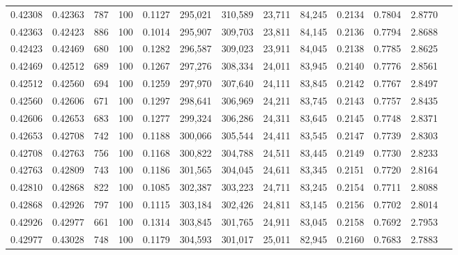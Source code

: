\begin{tabular}{rrrrrrrrrrrrr}
0.42308 & 0.42363 &   787 & 100 &                                     0.1127 & 295,021 & 310,589 &  23,711 &  84,245 & 0.2134 & 0.7804 & 2.8770 \\
0.42363 & 0.42423 &   886 & 100 &                                     0.1014 & 295,907 & 309,703 &  23,811 &  84,145 & 0.2136 & 0.7794 & 2.8688 \\
0.42423 & 0.42469 &   680 & 100 &                                     0.1282 & 296,587 & 309,023 &  23,911 &  84,045 & 0.2138 & 0.7785 & 2.8625 \\
0.42469 & 0.42512 &   689 & 100 &                                     0.1267 & 297,276 & 308,334 &  24,011 &  83,945 & 0.2140 & 0.7776 & 2.8561 \\
0.42512 & 0.42560 &   694 & 100 &                                     0.1259 & 297,970 & 307,640 &  24,111 &  83,845 & 0.2142 & 0.7767 & 2.8497 \\
0.42560 & 0.42606 &   671 & 100 &                                     0.1297 & 298,641 & 306,969 &  24,211 &  83,745 & 0.2143 & 0.7757 & 2.8435 \\
0.42606 & 0.42653 &   683 & 100 &                                     0.1277 & 299,324 & 306,286 &  24,311 &  83,645 & 0.2145 & 0.7748 & 2.8371 \\
0.42653 & 0.42708 &   742 & 100 &                                     0.1188 & 300,066 & 305,544 &  24,411 &  83,545 & 0.2147 & 0.7739 & 2.8303 \\
0.42708 & 0.42763 &   756 & 100 &                                     0.1168 & 300,822 & 304,788 &  24,511 &  83,445 & 0.2149 & 0.7730 & 2.8233 \\
0.42763 & 0.42809 &   743 & 100 &                                     0.1186 & 301,565 & 304,045 &  24,611 &  83,345 & 0.2151 & 0.7720 & 2.8164 \\
0.42810 & 0.42868 &   822 & 100 &                                     0.1085 & 302,387 & 303,223 &  24,711 &  83,245 & 0.2154 & 0.7711 & 2.8088 \\
0.42868 & 0.42926 &   797 & 100 &                                     0.1115 & 303,184 & 302,426 &  24,811 &  83,145 & 0.2156 & 0.7702 & 2.8014 \\
0.42926 & 0.42977 &   661 & 100 &                                     0.1314 & 303,845 & 301,765 &  24,911 &  83,045 & 0.2158 & 0.7692 & 2.7953 \\
0.42977 & 0.43028 &   748 & 100 &                                     0.1179 & 304,593 & 301,017 &  25,011 &  82,945 & 0.2160 & 0.7683 & 2.7883 \\

\end{tabular}
